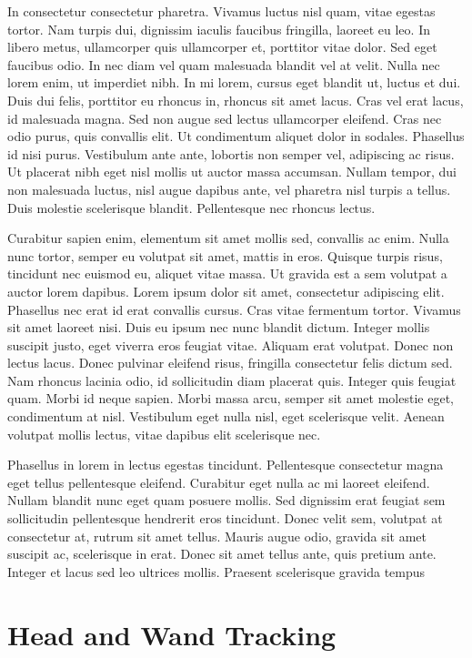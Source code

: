 \documentclass[12pt]{report}	%
\begin{document}
  In consectetur consectetur pharetra. Vivamus luctus nisl quam, vitae egestas tortor. Nam turpis dui, dignissim iaculis faucibus fringilla, laoreet eu leo. In libero metus, ullamcorper quis ullamcorper et, porttitor vitae dolor. Sed eget faucibus odio. In nec diam vel quam malesuada blandit vel at velit. Nulla nec lorem enim, ut imperdiet nibh. In mi lorem, cursus eget blandit ut, luctus et dui. Duis dui felis, porttitor eu rhoncus in, rhoncus sit amet lacus. Cras vel erat lacus, id malesuada magna. Sed non augue sed lectus ullamcorper eleifend. Cras nec odio purus, quis convallis elit. Ut condimentum aliquet dolor in sodales. Phasellus id nisi purus. Vestibulum ante ante, lobortis non semper vel, adipiscing ac risus. Ut placerat nibh eget nisl mollis ut auctor massa accumsan. Nullam tempor, dui non malesuada luctus, nisl augue dapibus ante, vel pharetra nisl turpis a tellus. Duis molestie scelerisque blandit. Pellentesque nec rhoncus lectus.

  Curabitur sapien enim, elementum sit amet mollis sed, convallis ac enim. Nulla nunc tortor, semper eu volutpat sit amet, mattis in eros. Quisque turpis risus, tincidunt nec euismod eu, aliquet vitae massa. Ut gravida est a sem volutpat a auctor lorem dapibus. Lorem ipsum dolor sit amet, consectetur adipiscing elit. Phasellus nec erat id erat convallis cursus. Cras vitae fermentum tortor. Vivamus sit amet laoreet nisi. Duis eu ipsum nec nunc blandit dictum. Integer mollis suscipit justo, eget viverra eros feugiat vitae. Aliquam erat volutpat. Donec non lectus lacus. Donec pulvinar eleifend risus, fringilla consectetur felis dictum sed. Nam rhoncus lacinia odio, id sollicitudin diam placerat quis. Integer quis feugiat quam. Morbi id neque sapien. Morbi massa arcu, semper sit amet molestie eget, condimentum at nisl. Vestibulum eget nulla nisl, eget scelerisque velit. Aenean volutpat mollis lectus, vitae dapibus elit scelerisque nec.

  Phasellus in lorem in lectus egestas tincidunt. Pellentesque consectetur magna eget tellus pellentesque eleifend. Curabitur eget nulla ac mi laoreet eleifend. Nullam blandit nunc eget quam posuere mollis. Sed dignissim erat feugiat sem sollicitudin pellentesque hendrerit eros tincidunt. Donec velit sem, volutpat at consectetur at, rutrum sit amet tellus. Mauris augue odio, gravida sit amet suscipit ac, scelerisque in erat. Donec sit amet tellus ante, quis pretium ante. Integer et lacus sed leo ultrices mollis. Praesent scelerisque gravida tempus
	\section{Head and Wand Tracking}
\end{document}
